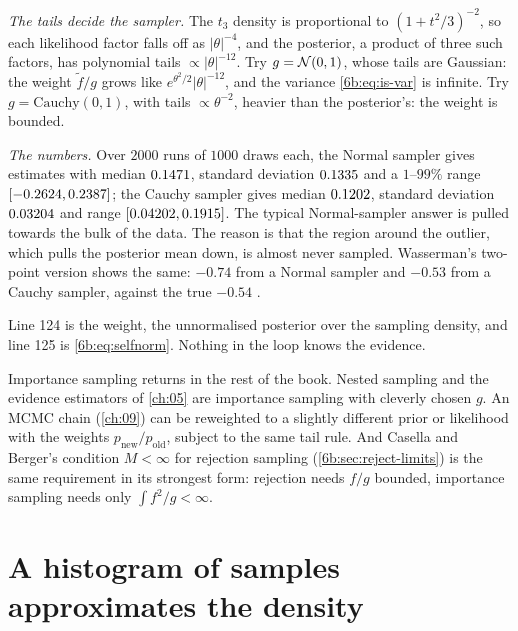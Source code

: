 \emph{The tails decide the sampler.} The $t_3$ density is proportional to
$(1+t^2/3)^{-2}$, so each likelihood factor falls off as $\lvert\theta\rvert^{-4}$, and the
posterior, a product of three such factors, has polynomial tails
$\propto\lvert\theta\rvert^{-12}$. Try $g=\mathcal{N}(0,1)$, whose tails are Gaussian: the weight
$\tilde f/g$ grows like $e^{\theta^2/2}\lvert\theta\rvert^{-12}$, and the variance
\eqref{6b:eq:is-var} is infinite. Try $g=\mathrm{Cauchy}(0,1)$, with tails
$\propto\theta^{-2}$, heavier than the posterior's: the weight is bounded.

\emph{The numbers.} Over $2000$ runs of $1000$ draws each, the Normal sampler gives estimates
with median $0.1471$, standard deviation $0.1335$ and a $1$--$99\%$ range
$[-0.2624,0.2387]$; the Cauchy sampler gives median $0.1202$,
standard deviation $0.03204$ and range $[0.04202,0.1915]$.
The typical Normal-sampler answer is pulled towards the bulk of the data. The reason is
that the region around the outlier, which pulls the posterior mean down, is almost never
sampled. Wasserman's
two-point version shows the same: $-0.74$ from a Normal sampler and $-0.53$ from a Cauchy sampler,
against the true $-0.54$ .


Line 124 is the weight, the unnormalised posterior over the sampling density, and line 125 is
\eqref{6b:eq:selfnorm}. Nothing in the loop knows the evidence.

Importance sampling returns in the rest of the book. Nested sampling and the evidence
estimators of \cref{ch:05} are importance sampling with cleverly chosen $g$. An MCMC chain
(\cref{ch:09}) can be reweighted to a slightly different prior or likelihood with the weights
$p_{\text{new}}/p_{\text{old}}$, subject to the same tail rule. And Casella and Berger's
condition $M<\infty$ for rejection sampling (\cref{6b:sec:reject-limits}) is the same requirement
in its strongest form: rejection needs $f/g$ bounded, importance sampling needs only
$\int f^2/g<\infty$.
\section{A histogram of samples approximates the density}
\label{6b:sec:histogram}

